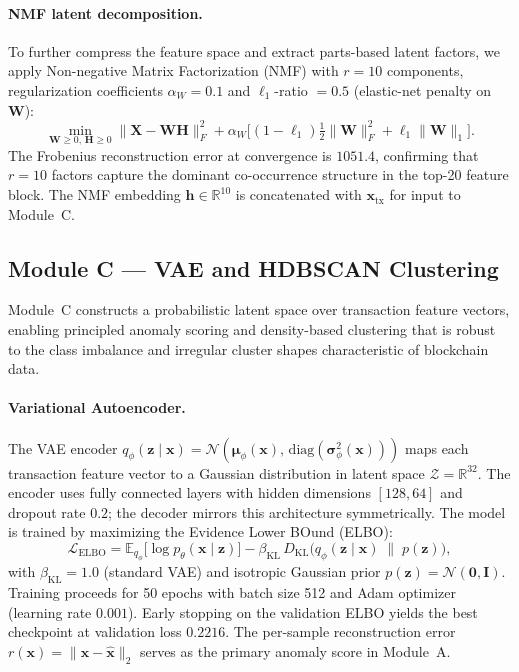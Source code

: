 \paragraph{NMF latent decomposition.}
To further compress the feature space and extract parts-based latent factors,
we apply Non-negative Matrix Factorization (NMF) with
$r = 10$ components, regularization coefficients
$\alpha_W = 0.1$ and $\ell_1$-ratio $= 0.5$
(elastic-net penalty on $\mathbf{W}$):
\begin{equation}
  \min_{\mathbf{W} \geq 0,\, \mathbf{H} \geq 0}
    \bigl\|\mathbf{X} - \mathbf{W}\mathbf{H}\bigr\|_F^2
    + \alpha_W \bigl[(1 - \ell_1)\tfrac{1}{2}\|\mathbf{W}\|_F^2
                    + \ell_1 \|\mathbf{W}\|_1\bigr].
  \label{eq:nmf}
\end{equation}
The Frobenius reconstruction error at convergence is $\num{1051.4}$,
confirming that $r = 10$ factors capture the dominant co-occurrence structure
in the top-20 feature block.
The NMF embedding $\mathbf{h} \in \mathbb{R}^{10}$ is concatenated with
$\mathbf{x}_{\mathrm{tx}}$ for input to Module~C.

\subsection{Module C — VAE and HDBSCAN Clustering}
\label{sec:module_c}

Module~C constructs a probabilistic latent space over transaction feature
vectors, enabling principled anomaly scoring and density-based clustering
that is robust to the class imbalance and irregular cluster shapes
characteristic of blockchain data.

\paragraph{Variational Autoencoder.}
The VAE encoder
$q_\phi(\mathbf{z} \mid \mathbf{x}) = \mathcal{N}(\boldsymbol{\mu}_\phi(\mathbf{x}),\,
\mathrm{diag}(\boldsymbol{\sigma}^2_\phi(\mathbf{x})))$
maps each transaction feature vector to a Gaussian distribution in latent
space $\mathcal{Z} = \mathbb{R}^{32}$.
The encoder uses fully connected layers with hidden dimensions $[128, 64]$
and dropout rate $0.2$; the decoder mirrors this architecture symmetrically.
The model is trained by maximizing the Evidence Lower BOund (ELBO):
\begin{equation}
  \mathcal{L}_{\mathrm{ELBO}}
    = \mathbb{E}_{q_\phi}\bigl[\log p_\theta(\mathbf{x} \mid \mathbf{z})\bigr]
      - \beta_{\mathrm{KL}}\,
        D_{\mathrm{KL}}\!\bigl(q_\phi(\mathbf{z} \mid \mathbf{x})
                               \;\|\; p(\mathbf{z})\bigr),
  \label{eq:elbo}
\end{equation}
with $\beta_{\mathrm{KL}} = 1.0$ (standard VAE) and isotropic Gaussian prior
$p(\mathbf{z}) = \mathcal{N}(\mathbf{0}, \mathbf{I})$.
Training proceeds for 50 epochs with batch size 512 and Adam
optimizer~\cite{kingma2014adam} (learning rate $0.001$).
Early stopping on the validation ELBO yields the best checkpoint at validation
loss $0.2216$.
The per-sample reconstruction error
$r(\mathbf{x}) = \|\mathbf{x} - \hat{\mathbf{x}}\|_2$
serves as the primary anomaly score in Module~A.

